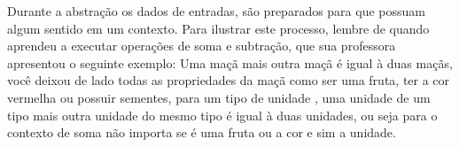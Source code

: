 Durante a abstração os dados de entradas, são preparados para que possuam algum sentido em um contexto. Para ilustrar este processo, lembre de quando aprendeu a executar operações de soma e subtração, que sua professora apresentou o seguinte exemplo:
Uma maçã mais outra maçã é igual à duas maçãs, você deixou de lado todas as propriedades da maçã como ser uma fruta, ter a cor vermelha  ou possuir sementes, para um tipo de unidade , uma unidade de um tipo mais outra unidade do mesmo tipo é igual à duas unidades, ou seja para o contexto de soma não importa se é uma fruta ou a cor e sim a unidade.